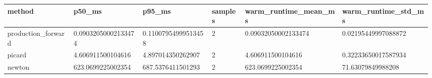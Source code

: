 \begin{tabular}{llllll}
 \toprule
method & p50\_ms & p95\_ms & samples & warm\_runtime\_mean\_ms & warm\_runtime\_std\_ms \\ \midrule
production\_forward & 0.09032050002133474 & 0.11007954999513458 & 2 & 0.09032050002133474 & 0.02195449997088872 \\
picard & 4.606911500104616 & 4.897014350262907 & 2 & 4.606911500104616 & 0.32233650017587934 \\
newton & 623.0699225002354 & 687.5376411501293 & 2 & 623.0699225002354 & 71.63079849988208 \\
\bottomrule
\end{tabular}